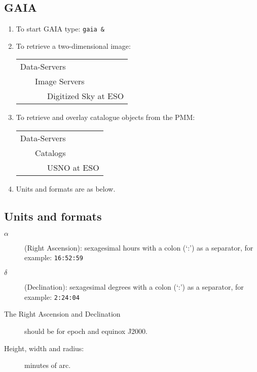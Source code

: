 \documentclass[twoside,11pt]{article}
\renewcommand{\_}{\texttt{\symbol{95}}}
\begin{document}
\subsection*{GAIA}

\begin{enumerate}

  \item To start GAIA type: {\tt gaia \&}

  \item To retrieve a two-dimensional image:

  \begin{tabular}{l}
   {\sf Data-Servers} \\
   {\sf ~~~ Image Servers} \\
   {\sf ~~~~~~ Digitized Sky at ESO} \\
  \end{tabular}

  \item To retrieve and overlay catalogue objects from the PMM:

  \begin{tabular}{l}
   {\sf Data-Servers} \\
   {\sf ~~~ Catalogs} \\
   {\sf ~~~~~~ USNO at ESO} \\
  \end{tabular}

  \item Units and formats are as below.

\end{enumerate}

\subsection*{Units and formats}

\begin{description}

  \item[$\alpha$] (Right Ascension): sexagesimal hours with a colon
   (`:') as a separator, for example: {\tt 16:52:59}

  \item[$\delta$] (Declination): sexagesimal degrees with a colon
   (`:') as a separator, for example: {\tt 2:24:04}

  \item[{\rm The Right Ascension and Declination}] should be for epoch
   and equinox J2000.

  \item[{\rm Height, width and radius:}] minutes of arc.

\end{description}
\end{document}
